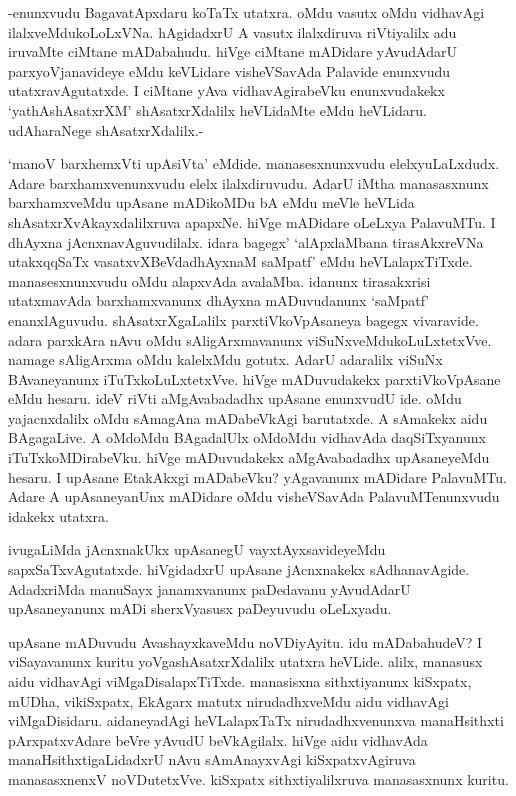 -enunxvudu BagavatApxdaru koTaTx utatxra. oMdu vasutx oMdu vidhavAgi ilalxveMdukoLoLxVNa. hAgidadxrU A vasutx ilalxdiruva riVtiyalilx adu iruvaMte ciMtane mADabahudu. hiVge ciMtane mADidare yAvudAdarU parxyoVjanavideye eMdu keVLidare visheVSavAda Palavide enunxvudu utatxravAgutatxde. I ciMtane yAva vidhavAgirabeVku enunxvudakekx `yathAshAsatxrXM' shAsatxrXdalilx heVLidaMte eMdu heVLidaru. udAharaNege shAsatxrXdalilx.- 

`manoV barxhemxVti upAsiVta' eMdide. manasesxnunxvudu elelxyuLaLxdudx. Adare barxhamxvenunxvudu elelx ilalxdiruvudu. AdarU iMtha manasasxnunx barxhamxveMdu upAsane mADikoMDu bA eMdu meVle heVLida shAsatxrXvAkayxdalilxruva apapxNe. hiVge mADidare oLeLxya PalavuMTu. I dhAyxna jAcnxnavAguvudilalx. idara bagegx' `alApxlaMbana tirasAkxreVNa utakxqqSaTx vasatxvXBeVdadhAyxnaM saMpatf' eMdu heVLalapxTiTxde. manasesxnunxvudu oMdu alapxvAda avalaMba. idanunx tirasakxrisi utatxmavAda barxhamxvanunx dhAyxna mADuvudanunx `saMpatf' enanxlAguvudu. shAsatxrXgaLalilx parxtiVkoVpAsaneya bagegx vivaravide. adara parxkAra nAvu oMdu sAligArxmavanunx viSuNxveMdukoLuLxtetxVve. namage sAligArxma oMdu kalelxMdu gotutx. AdarU adaralilx viSuNx BAvaneyanunx iTuTxkoLuLxtetxVve. hiVge mADuvudakekx parxtiVkoVpAsane eMdu hesaru. ideV riVti aMgAvabadadhx upAsane enunxvudU ide. oMdu yajacnxdalilx oMdu sAmagAna mADabeVkAgi barutatxde. A sAmakekx aidu BAgagaLive. A oMdoMdu BAgadalUlx oMdoMdu vidhavAda daqSiTxyanunx iTuTxkoMDirabeVku. hiVge mADuvudakekx aMgAvabadadhx upAsaneyeMdu hesaru. I upAsane EtakAkxgi mADabeVku? yAgavanunx mADidare PalavuMTu. Adare A upAsaneyanUnx mADidare oMdu visheVSavAda PalavuMTenunxvudu idakekx utatxra.

ivugaLiMda jAcnxnakUkx upAsanegU vayxtAyxsavideyeMdu sapxSaTxvAgutatxde. hiVgidadxrU upAsane jAcnxnakekx sAdhanavAgide. AdadxriMda manuSayx janamxvanunx paDedavanu yAvudAdarU upAsaneyanunx mADi sherxVyasusx paDeyuvudu oLeLxyadu.

upAsane mADuvudu AvashayxkaveMdu noVDiyAyitu. idu mADabahudeV? I viSayavanunx kuritu yoVgashAsatxrXdalilx utatxra heVLide. alilx, manasusx aidu vidhavAgi viMgaDisalapxTiTxde. manasisxna sithxtiyanunx kiSxpatx, mUDha, vikiSxpatx, EkAgarx matutx nirudadhxveMdu aidu vidhavAgi viMgaDisidaru. aidaneyadAgi heVLalapxTaTx nirudadhxvenunxva manaHsithxti pArxpatxvAdare beVre yAvudU beVkAgilalx. hiVge aidu vidhavAda manaHsithxtigaLidadxrU nAvu sAmAnayxvAgi kiSxpatxvAgiruva manasasxnenxV noVDutetxVve. kiSxpatx sithxtiyalilxruva manasasxnunx kuritu.

